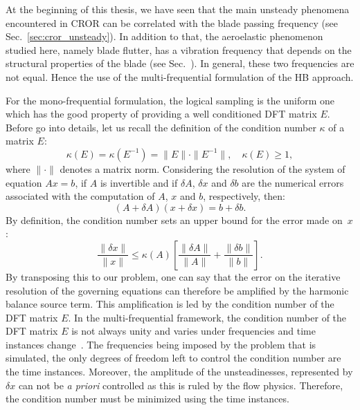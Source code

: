 
At the beginning of this thesis, we have seen that the main unsteady
phenomena encountered in CROR can be correlated with the blade passing
frequency (see Sec.~\ref{sec:cror_unsteady}).
In addition to that, the aeroelastic phenomenon
studied here, namely blade flutter, has a vibration frequency that
depends on the structural properties of the blade (see Sec.~). 
In general, these two
frequencies are not equal. Hence the use of the
multi-frequential formulation of the HB approach. 


For the mono-frequential formulation, the logical sampling is the uniform one
which has the good property of providing
a well conditioned DFT matrix $E$.
Before go into details, let us recall the definition of the
condition number $\kappa$ of a matrix $E$:
\begin{equation}
  \kappa (E) = \kappa (E^{-1}) = \| E \| \cdot \| E^{-1} \|, \quad
    \kappa(E) \geq 1,
\end{equation}
where $\| \cdot \|$ denotes a matrix norm. Considering the resolution
of the system of equation
$A x = b$, if $A$ is invertible and if $\delta A$, $\delta x$ and
$\delta b$ are the numerical errors associated with the computation of
$A$, $x$ and $b$, respectively, then:
\begin{equation}
   (A + \delta A)(x + \delta x) = b + \delta b.
   \label{eq:error_reso}
\end{equation}
By definition, the condition number sets an upper bound for 
the error made on~$x$:
\begin{equation}
   \frac{\| \delta x \|}{\| x \|} \leq 
   \kappa(A)\left[\frac{\| \delta A \|}{\| A \|} + 
   \frac{\| \delta b \|}{\| b \|} \right].
   \label{eq:conditonnig_amp}
\end{equation}
By transposing this to our problem, one can say that
the error on the iterative resolution of the governing equations can
therefore be amplified by the harmonic balance source term.
This amplification is
led by the condition number of the DFT matrix $E$. 
In the multi-frequential framework,
the condition number of the DFT matrix $E$ is not always unity and
varies under frequencies and time instances change~\cite{Kundert1988}. 
The frequencies
being imposed by the problem that is simulated,
the only degrees of freedom left to control the condition
number are the time instances. 
Moreover, the amplitude of the unsteadinesses, represented by $\delta x$
can not be \emph{a priori} controlled as this is ruled by the flow physics. 
Therefore, the condition
number must be minimized using the time instances.

